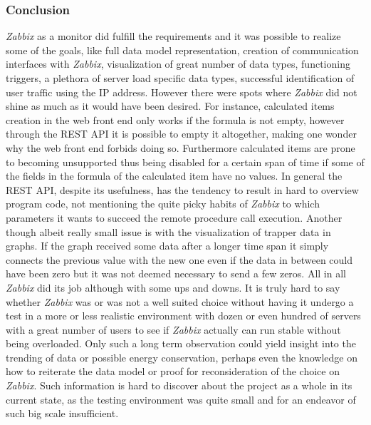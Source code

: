 \subsubsection{Conclusion}
	\textit{Zabbix} as a monitor did fulfill the requirements and it was possible to realize some of the goals, like full data model representation, creation of communication interfaces with \textit{Zabbix}, visualization of great number of data types, functioning triggers, a plethora of server load specific data types, successful identification of user traffic using the IP address. However there were spots where \textit{Zabbix} did not shine as much as it would have been desired. For instance, calculated items creation in the web front end only works if the formula is not empty, however through the REST API it is possible to empty it altogether, making one wonder why the web front end forbids doing so. Furthermore calculated items are prone to becoming unsupported thus being disabled for a certain span of time if some of the fields in the formula of the calculated item have no values. In general the REST API, despite its usefulness, has the tendency to result in hard to overview program code, not mentioning the quite picky habits of \textit{Zabbix} to which parameters it wants to succeed the remote procedure call execution. Another though albeit really small issue is with the visualization of trapper data in graphs. If the graph received some data after a longer time span it simply connects the previous value with the new one even if the data in between could have been zero but it was not deemed necessary to send a few zeros.
	All in all \textit{Zabbix} did its job although with some ups and downs. It is truly hard to say whether \textit{Zabbix} was or was not a well suited choice without having it undergo a test in a more or less realistic environment with dozen or even hundred of servers with a great number of users to see if \textit{Zabbix} actually can run stable without being overloaded. Only such a long term observation could yield insight into the trending of data or possible energy conservation, perhaps even the knowledge on how to reiterate the data model or proof for reconsideration of the choice on \textit{Zabbix}. Such information is hard to discover about the project as a whole in its current state, as the testing environment was quite small and for an endeavor of such big scale insufficient.